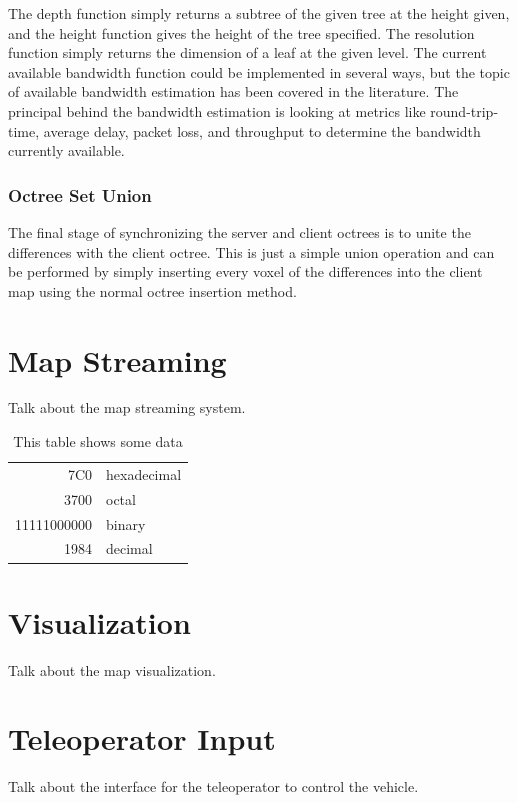 \documentclass[12pt]{report}
\begin{document}
The depth function simply returns a subtree of the given tree at the height given, and the height function gives the height of the tree specified.  The resolution function simply returns the dimension of a leaf at the given level.  The current available bandwidth function could be implemented in several ways, but the topic of available bandwidth estimation has been covered in the literature.\cite{prasad2003bandwidth} The principal behind the bandwidth estimation is looking at metrics like round-trip-time, average delay, packet loss, and throughput to determine the bandwidth currently available.

\subsubsection{Octree Set Union}
The final stage of synchronizing the server and client octrees is to unite the differences with the client octree. This is just a simple union operation and can be performed by simply inserting every voxel of the differences into the client map using the normal octree insertion method.\cite{meagher1982geometric}

\section{Map Streaming}
Talk about the map streaming system.

\begin{table}[ht]
\centering
\begin{tabular}{|r|l|}
  \hline
  7C0 & hexadecimal \\
  3700 & octal \\ \cline{2-2}
  11111000000 & binary \\
  \hline \hline
  1984 & decimal \\
  \hline
\end{tabular}
\caption{This table shows some data}
\label{tab:myfirsttable}
\end{table}

\section{Visualization}
Talk about the map visualization.

\section{Teleoperator Input}
Talk about the interface for the teleoperator to control the vehicle.
\end{document}

